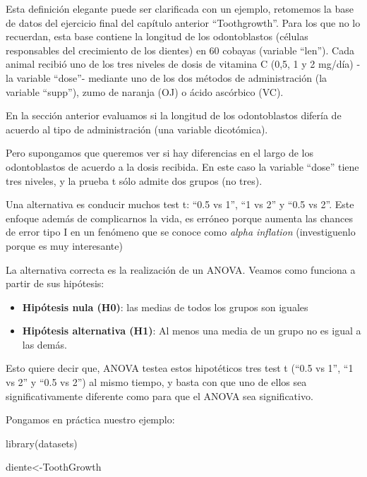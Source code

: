 \documentclass[
]{book}
\newenvironment{Shaded}{\begin{snugshade}}{\end{snugshade}}
\newcommand{\FunctionTok}[1]{\textcolor[rgb]{0.00,0.00,0.00}{#1}}
\newcommand{\NormalTok}[1]{#1}
\newcommand{\OtherTok}[1]{\textcolor[rgb]{0.56,0.35,0.01}{#1}}
\begin{document}
Esta definición elegante puede ser clarificada con un ejemplo, retomemos la base de datos del ejercicio final del capítulo anterior ``Toothgrowth''.
Para los que no lo recuerdan, esta base contiene la longitud de los odontoblastos (células responsables del crecimiento de los dientes) en 60 cobayas (variable ``len''). Cada animal recibió uno de los tres niveles de dosis de vitamina C (0,5, 1 y 2 mg/día) -la variable ``dose''- mediante uno de los dos métodos de administración (la variable ``supp''), zumo de naranja (OJ) o ácido ascórbico (VC).

En la sección anterior evaluamos si la longitud de los odontoblastos difería de acuerdo al tipo de administración (una variable dicotómica).

Pero supongamos que queremos ver si hay diferencias en el largo de los odontoblastos de acuerdo a la dosis recibida. En este caso la variable ``dose'' tiene tres niveles, y la prueba t sólo admite dos grupos (no tres).

Una alternativa es conducir muchos test t: ``0.5 vs 1'', ``1 vs 2'' y ``0.5 vs 2''. Este enfoque además de complicarnos la vida, es erróneo porque aumenta las chances de error tipo I en un fenómeno que se conoce como \emph{alpha inflation} (investiguenlo porque es muy interesante)

La alternativa correcta es la realización de un ANOVA. Veamos como funciona a partir de sus hipótesis:

\begin{itemize}
\item
  \textbf{Hipótesis nula (H0)}: las medias de todos los grupos son iguales
\item
  \textbf{Hipótesis alternativa (H1)}: Al menos una media de un grupo no es igual a las demás.
\end{itemize}

Esto quiere decir que, ANOVA testea estos hipotéticos tres test t (``0.5 vs 1'', ``1 vs 2'' y ``0.5 vs 2'') al mismo tiempo, y basta con que uno de ellos sea significativamente diferente como para que el ANOVA sea significativo.

Pongamos en práctica nuestro ejemplo:

\begin{Shaded}
\begin{Highlighting}[]
\FunctionTok{library}\NormalTok{(datasets)}

\NormalTok{diente}\OtherTok{\textless{}{-}}\NormalTok{ToothGrowth}
\end{Highlighting}
\end{Shaded}
\end{document}
